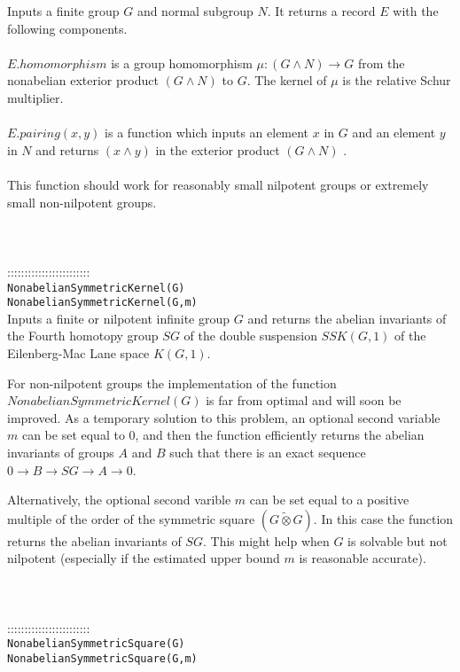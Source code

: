 \documentclass[a4paper,11pt]{report}
\begin{document}
{ Inputs a finite group $G$ and normal subgroup $N$. It returns a record $E$ with the following components. \\
 \\
 $E.homomorphism$ is a group homomorphism ${\ensuremath{\mu}} : (G \wedge N) \longrightarrow G$ from the nonabelian exterior product $(G \wedge N)$ to $G$. The kernel of ${\ensuremath{\mu}}$ is the relative Schur multiplier. \\
 \\
 $E.pairing(x,y)$ is a function which inputs an element $x$ in $G$ and an element $y$ in $N$ and returns $(x \wedge y)$ in the exterior product $(G \wedge N)$ . \\
 \\
 This function should work for reasonably small nilpotent groups or extremely
small non-nilpotent groups. \\
 \\
 \\
 \\
 ::::::::::::::::::::::::\\
 \texttt{NonabelianSymmetricKernel(G) }\\
 \texttt{NonabelianSymmetricKernel(G,m) }\\
 

 Inputs a finite or nilpotent infinite group $G$ and returns the abelian invariants of the Fourth homotopy group $SG$ of the double suspension $SSK(G,1)$ of the Eilenberg-Mac Lane space $K(G,1)$. 

 For non-nilpotent groups the implementation of the function $NonabelianSymmetricKernel(G)$ is far from optimal and will soon be improved. As a temporary solution to this
problem, an optional second variable $m$ can be set equal to $0$, and then the function efficiently returns the abelian invariants of groups $A$ and $B$ such that there is an exact sequence $0 \longrightarrow B \longrightarrow SG \longrightarrow A \longrightarrow 0$. 

 Alternatively, the optional second varible $m$ can be set equal to a positive multiple of the order of the symmetric square $(G \tilde\otimes G)$. In this case the function returns the abelian invariants of $SG$. This might help when $G$ is solvable but not nilpotent (especially if the estimated upper bound $m$ is reasonable accurate). \\
 \\
 \\
 \\
 ::::::::::::::::::::::::\\
 \texttt{NonabelianSymmetricSquare(G) }\\
 \texttt{NonabelianSymmetricSquare(G,m) }\\
 

}
\end{document}
